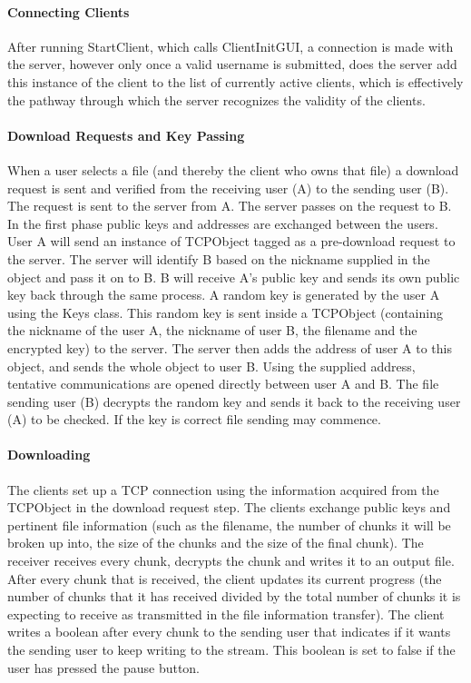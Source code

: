 \documentclass[12pt, a4paper]{article}
\begin{document}
\paragraph{Connecting Clients}
After running StartClient, which calls ClientInitGUI, a connection is made with the server, however only once a valid username is submitted, does the server add this instance of the client to the list of currently active clients, which is effectively the pathway through which the server recognizes the validity of the clients.

\paragraph{Download Requests and Key Passing}
When a user selects a file (and thereby the client who owns that file) a download request is sent and verified from the receiving user (A) to the sending user (B). The request is sent to the server from A. The server passes on the request to B. In the first phase public keys and addresses are exchanged between the users. User A will send an instance of TCPObject tagged as a pre-download request to the server. The server will identify B based on the nickname supplied in the object and pass it on to B. B will receive A's public key and sends its own public key back through the same process. A random key is generated by the user A using the Keys class. This random key is sent inside a TCPObject (containing the nickname of the user A, the nickname of user B, the filename and the encrypted key) to the server. The server then adds the address of user A to this object, and sends the whole object to user B. Using the supplied address, tentative communications are opened directly between user A and B. The file sending user (B) decrypts the random key and sends it back to the receiving user (A) to be checked. If the key is correct file sending may commence.

\paragraph{Downloading}
The clients set up a TCP connection using the information acquired from the TCPObject in the download request step. The clients exchange public keys and pertinent file information (such as the filename, the number of chunks it will be broken up into, the size of the chunks and the size of the final chunk). The receiver receives every chunk, decrypts the chunk and writes it to an output file.
After every chunk that is received, the client updates its current progress (the number of chunks that it has received divided by the total number of chunks it is expecting to receive as transmitted in the file information transfer). The client writes a boolean after every chunk to the sending user that indicates if it wants the sending user to keep writing to the stream. This boolean is set to false if the user has pressed the pause button.
\end{document}
